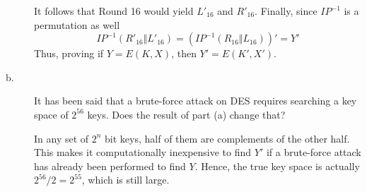 \documentclass[../hw_sols.tex]{subfiles}
\begin{document}
\begin{description}
\begin{solution}
It follows that Round 16 would yield $L'_{16}$ and $R'_{16}$. Finally, since 
$IP^{-1}$ is a permutation as well
	\[ IP^{-1}(R'_{16} \Vert L'_{16}) 
	= (IP^{-1}(R_{16} \Vert L_{16}))' 
	= Y' \]
Thus, proving if $Y = E(K,X)$, then $Y' = E(K',X')$.

\end{solution}
	
\item[b.] It has been said that a brute-force attack on DES requires searching 
a key space of $2^{56}$ keys. Does the result of part (a) change that?

\begin{solution}
In any set of $2^n$ bit keys, half of them are complements of the other half. 
This makes it computationally inexpensive to find $Y'$ if a brute-force attack 
has already been performed to find $Y$. Hence, the true key space is actually 
$2^{56}/2 = 2^{55}$, which is still large.
\end{solution}

\end{description}
\end{document}
